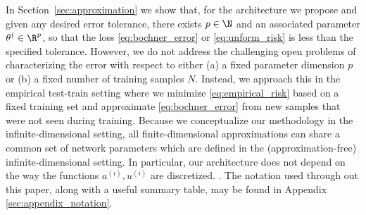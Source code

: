 In Section~\ref{sec:approximation} we show that, for the
architecture we propose and given any desired error tolerance, there exists \(p \in \N\) and an associated parameter \(\theta^\dagger \in \R^p\), so that the loss \eqref{eq:bochner_error} or \eqref{eq:unform_risk} is less
than the specified tolerance. However, we do not address the challenging open problems of characterizing the error with respect to either (a) a fixed parameter dimension \(p\) or (b) a fixed number of training samples \(N\). Instead, we approach this in the empirical test-train setting where we minimize \eqref{eq:empirical_risk} based on a fixed training set and approximate \eqref{eq:bochner_error} from new samples that were not seen during training.   
Because we conceptualize our methodology in the
infinite-dimensional setting, all finite-dimensional approximations
can share a common set of network parameters which are defined in the (approximation-free) infinite-dimensional setting. In particular, our architecture does not depend on the way the functions \(a^{(i)},u^{(i)}\) are discretized.
. The notation used through out this paper,
along with a useful summary table, may be found in
Appendix \ref{sec:appendix_notation}.


\iffalse
To be concrete, we consider  Banach
spaces of real-valued functions defined on a bounded open set $D$ in $\mathbb{R}^d$. We then consider
mappings $\Ftrue$ which take input functions defined on $D$ and map them to 
another set of functions, also defined on $D$.
Generalizations, in which the input and output functions are defined
over different domains, are straightforward conceptually, but not studied.
in this paper.
\fi 


